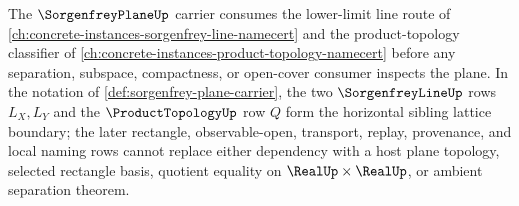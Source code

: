 The $\SorgenfreyPlaneUp$ carrier consumes the lower-limit line route of \autoref{ch:concrete-instances-sorgenfrey-line-namecert} and the product-topology classifier of \autoref{ch:concrete-instances-product-topology-namecert} before any separation, subspace, compactness, or open-cover consumer inspects the plane. In the notation of \autoref{def:sorgenfrey-plane-carrier}, the two $\SorgenfreyLineUp$ rows $L_X,L_Y$ and the $\ProductTopologyUp$ row $Q$ form the horizontal sibling lattice boundary; the later rectangle, observable-open, transport, replay, provenance, and local naming rows cannot replace either dependency with a host plane topology, selected rectangle basis, quotient equality on $\RealUp\times\RealUp$, or ambient separation theorem.
